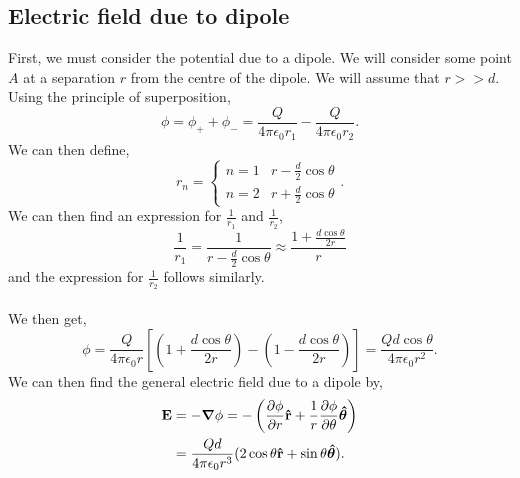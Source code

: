 \documentclass{book}
\begin{document}
\subsection{Electric field due to dipole}
First, we must consider the potential due to a dipole. We will consider some point $A$ at a separation $r$ from the centre of the dipole. We will assume that $r >> d$. Using the principle of superposition,
\begin{equation}
    \phi = \phi_+ + \phi_- = \frac{Q}{4\pi\epsilon_0 r_1} - \frac{Q}{4\pi\epsilon_0r_2}.
\end{equation}
We can then define,
\begin{equation}
    r_n = \begin{cases}
        n = 1 & r - \frac{d}{2}\cos\theta \\
        n = 2 & r + \frac{d}{2}\cos\theta
    \end{cases}.
\end{equation}
We can then find an expression for $\frac{1}{r_1}$ and $\frac{1}
{r_2}$,
\begin{equation}
    \frac{1}{r_1} = \frac{1}{r-\frac{d}{2}\cos\theta} \approx
    \frac{1 + \frac{d\cos\theta}{2r}}{r}
\end{equation}
and the expression for $\frac{1}{r_2}$ follows similarly. 
\\\\
We then get,
\begin{equation}
    \phi = \frac{Q}{4\pi\epsilon_0r}\left[\left(1 + \frac{d\cos\theta}{2r}\right)-\left(1 - \frac{d\cos\theta}{2r}\right)\right] = \frac{Qd\cos\theta}{4\pi\epsilon_0 r^2}.
\end{equation}
We can then find the general electric field due to a dipole by,
\begin{equation}
\begin{split}
    \vb{E} & = -\grad \phi = -\left(\pdv{\phi}{r}\vu{r} + \frac{1}{r}\pdv{\phi}{\theta}\vu*{\theta}\right) \\
    & = \frac{Qd}{4\pi\epsilon_0 r^3}(2\cos\theta \vu{r} + \sin\theta \vu*{\theta}).
\end{split}
\end{equation}
\end{document}

